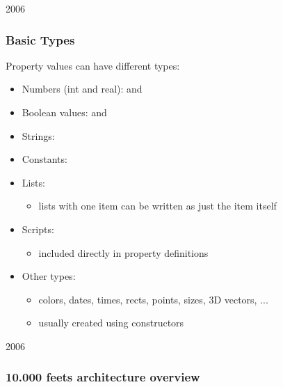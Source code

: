 \begin{slide}{2006}\frametitle{Basic Types}
Property values can have different types:
\begin{itemize}
\item Numbers (int and real):  and 
\item Boolean values:  and 
\item Strings: 
\item Constants: 
\vspace*{0.25em}
\item Lists: 
  \begin{itemize}
  \item lists with one item can be written as just the item itself
  \end{itemize}
  \vspace*{0.25em}
\item Scripts:
  \begin{itemize}
  \item included directly in property definitions
  \end{itemize}
  \vspace*{0.25em}
\item Other types:
  \begin{itemize}
  \item colors, dates, times, rects, points, sizes, 3D vectors, ...
  \item usually created using constructors
  \end{itemize}
\end{itemize}


\end{slide}


\begin{slide}{2006}\frametitle{10.000 feets architecture overview}
\vspace{10mm}

\end{slide}

